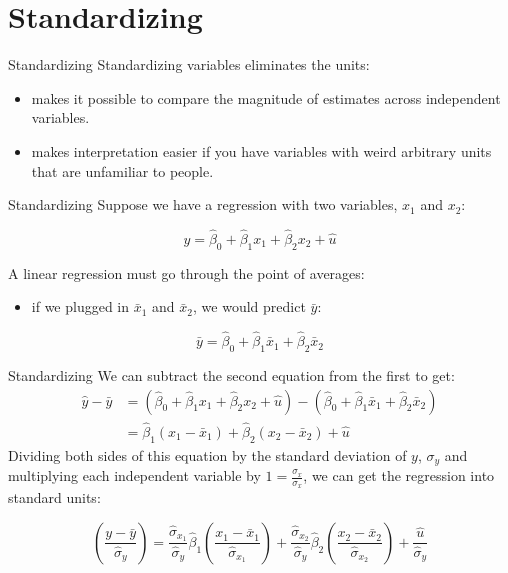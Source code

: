 \documentclass[
  ignorenonframetext,
]{beamer}
\providecommand{\tightlist}{%
  \setlength{\itemsep}{0pt}\setlength{\parskip}{0pt}}
\begin{document}
\hypertarget{standardizing}{%
\section{Standardizing}\label{standardizing}}

\begin{frame}{Standardizing}
\protect\hypertarget{standardizing-1}{}
Standardizing variables eliminates the units:

\begin{itemize}
\item
  makes it possible to compare the magnitude of estimates across
  independent variables.
\item
  makes interpretation easier if you have variables with weird arbitrary
  units that are unfamiliar to people.
\end{itemize}
\end{frame}

\begin{frame}{Standardizing}
\protect\hypertarget{standardizing-2}{}
Suppose we have a regression with two variables, \(x_1\) and \(x_2\):

\[
y=\hat{\beta}_0+\hat{\beta}_1 x_1 +\hat{\beta}_2x_2+\hat{u}
\]

A linear regression must go through the point of averages:

\begin{itemize}
\tightlist
\item
  if we plugged in \(\bar{x}_1\) and \(\bar{x}_2\), we would predict
  \(\bar{y}\):
\end{itemize}

\[
\bar{y}=\hat{\beta}_0+\hat{\beta}_1\bar{x}_1 +\hat{\beta}_2\bar{x}_2
\]
\end{frame}

\begin{frame}{Standardizing}
\protect\hypertarget{standardizing-3}{}
We can subtract the second equation from the first to get: \[
\begin{aligned}
\hat{y}-\bar{y}&=(\hat{\beta}_0+\hat{\beta}_1 x_1 +\hat{\beta}_2
x_2+\hat{u})-(\hat{\beta}_0+\hat{\beta}_1\bar{x}_1 +\hat{\beta}_2\bar{x}_2)\\
&=\hat{\beta}_1( x_1-\bar{x}_1) +\hat{\beta}_2(
x_2-\bar{x}_2)+\hat{u}
\end{aligned}
\] Dividing both sides of this equation by the standard deviation of
\(y\), \(\sigma_y\) and multiplying each independent variable by
\(1=\frac{\sigma_x}{\sigma_x}\), we can get the regression into standard
units:

\[
(\frac{y-\bar{y}}{\hat{\sigma}_y})=\frac{\hat{\sigma}_{x_1}}{\hat{\sigma}_y}\hat{\beta}_1(\frac{x_1-\bar{x}_1}{\hat{\sigma}_{x_1}})+\frac{\hat{\sigma}_{x_2}}{\hat{\sigma}_y}\hat{\beta}_2(\frac{x_2-\bar{x}_2}{\hat{\sigma}_{x_2}})+\frac{\hat{u}}{\hat{\sigma}_y}
\]
\end{frame}
\end{document}

